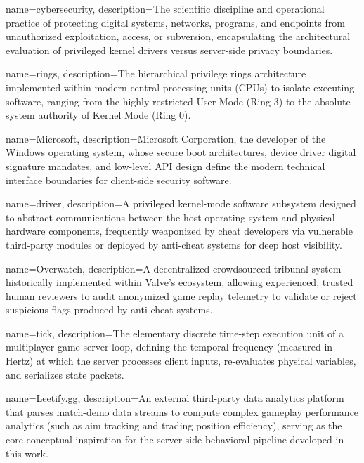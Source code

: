 {
    name=cybersecurity,
    description={The scientific discipline and operational practice of protecting digital systems, networks, programs, and endpoints from unauthorized exploitation, access, or subversion, encapsulating the architectural evaluation of privileged kernel drivers versus server-side privacy boundaries.}
}

{
    name=rings,
    description={The hierarchical privilege rings architecture implemented within modern central processing units (CPUs) to isolate executing software, ranging from the highly restricted User Mode (Ring 3) to the absolute system authority of Kernel Mode (Ring 0).}
}

{
    name=Microsoft,
    description={Microsoft Corporation, the developer of the Windows operating system, whose secure boot architectures, device driver digital signature mandates, and low-level API design define the modern technical interface boundaries for client-side security software.}
}

{
    name=driver,
    description={A privileged kernel-mode software subsystem designed to abstract communications between the host operating system and physical hardware components, frequently weaponized by cheat developers via vulnerable third-party modules or deployed by anti-cheat systems for deep host visibility.}
}

{
    name=Overwatch,
    description={A decentralized crowdsourced tribunal system historically implemented within Valve's ecosystem, allowing experienced, trusted human reviewers to audit anonymized game replay telemetry to validate or reject suspicious flags produced by anti-cheat systems.}
}

{
    name=tick,
    description={The elementary discrete time-step execution unit of a multiplayer game server loop, defining the temporal frequency (measured in Hertz) at which the server processes client inputs, re-evaluates physical variables, and serializes state packets.}
}

{
    name=Leetify.gg,
    description={An external third-party data analytics platform that parses match-demo data streams to compute complex gameplay performance analytics (such as aim tracking and trading position efficiency), serving as the core conceptual inspiration for the server-side behavioral pipeline developed in this work.}
}

